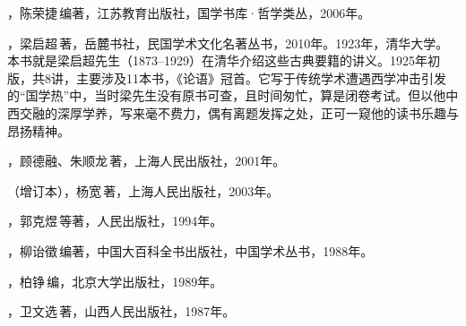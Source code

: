 ，陈荣捷\,编著，江苏教育出版社，国学书库·哲学类丛，2006年。

，梁启超\,著，岳麓书社，民国学术文化名著丛书，2010年。1923年，清华大学。本书就是梁启超先生（1873--1929）在清华介绍这些古典要籍的讲义。1925年初版，共8讲，主要涉及11本书，《论语》冠首。它写于传统学术遭遇西学冲击引发的“国学热”中，当时梁先生没有原书可查，且时间匆忙，算是闭卷考试。但以他中西交融的深厚学养，写来毫不费力，偶有离题发挥之处，正可一窥他的读书乐趣与昂扬精神。

，顾德融、朱顺龙\,著，上海人民出版社，2001年。

（增订本），杨宽\,著，上海人民出版社，2003年。

，郭克煜\,等著，人民出版社，1994年。

，柳诒徵\,编著，中国大百科全书出版社，中国学术丛书，1988年。

，柏铮\,编，北京大学出版社，1989年。

，卫文选\,著，山西人民出版社，1987年。
